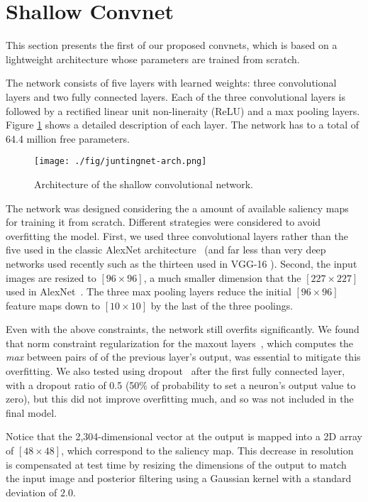 \documentclass[10pt,twocolumn,letterpaper]{article}
\begin{document}
\section{Shallow Convnet}\label{sec:JuntingNet}%
This section presents the first of our proposed convnets, which is based on a lightweight architecture whose parameters are trained from scratch.


The network consists of five layers with learned weights: three convolutional layers and two fully connected layers.
Each of the three convolutional layers is followed by a rectified linear unit non-lineraity (ReLU) and a max pooling layers.
Figure \ref{fig:juntingnet} shows a detailed description of each layer. The network has to a total of 64.4 million free parameters. 

\begin{figure}
  \centering
  \texttt{[image: ./fig/juntingnet-arch.png]}
  \caption{Architecture of the shallow convolutional network.}
  \label{fig:juntingnet}
\end{figure}%

The network was designed considering the a amount of available saliency maps for training it from scratch.
Different strategies were considered to avoid overfitting the model.
First, we used three convolutional layers rather than the five used in the classic AlexNet architecture~\cite{krizhevsky2012imagenet} (and far less than very deep networks used recently such as the thirteen used in VGG-16 \cite{simonyan2014very}).
Second, the input images are resized to $[96 \times 96]$, a much smaller dimension that the $[227 \times 227]$ used in AlexNet~\cite{krizhevsky2012imagenet}.
The three max pooling layers reduce the initial $[96 \times 96]$ feature maps down to $[10 \times 10]$ by the last of the three  poolings.

Even with the above constraints, the network still overfits significantly. We found that norm constraint regularization for the maxout layers~\cite{goodfellow2013maxout}, which computes the \textit{max} between pairs of of the previous layer’s output,
was essential to mitigate this overfitting.
We also tested using dropout~\cite{hinton2012improving} after the first fully connected layer, with a dropout ratio of 0.5 (50\% of probability to set a neuron's output value to zero), but this did not improve overfitting much, and so was not included in the final model.

Notice that the 2,304-dimensional vector at the output is mapped into a 2D array of $[48 \times 48]$, which correspond to the saliency map.
This decrease in resolution is compensated at test time by resizing the dimensions of the output to match the input image and posterior filtering using a Gaussian kernel with a standard deviation of $2.0$.
\end{document}
